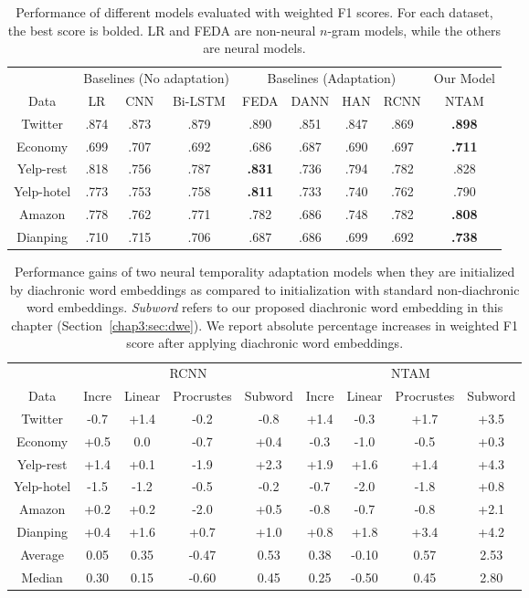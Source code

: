 \begin{table}[t]
\centering
\begin{tabular}{c||ccc||cccc||c}
 & \multicolumn{3}{c||}{Baselines (No adaptation)} & \multicolumn{4}{c||}{Baselines (Adaptation)} & Our Model \\
Data & LR & CNN & Bi-LSTM & FEDA & DANN & HAN & RCNN & NTAM\\\hline\hline
Twitter & .874 & .873 & .879 & .890 & .851 & .847 & .869 & \textbf{.898} \\
Economy & .699 & .707 & .692 & .686 & .687 & .690 & .697 &  \textbf{.711} \\
Yelp-rest & .818 & .756 & .787 & \textbf{.831} & .736 & .794 & .782 & .828 \\
Yelp-hotel & .773 & .753 & .758 & \textbf{.811} & .733 & .740 & .762 & .790 \\
Amazon & .778 & .762 & .771 & .782 & .686 & .748 & .782 & \textbf{.808} \\
Dianping & .710 & .715 & .706 & .687 & .686 & .699 & .692 & \textbf{.738}
\end{tabular}
\caption{Performance of different models evaluated with weighted F1 scores. For each dataset, the best score is bolded. 
LR and FEDA are non-neural $n$-gram models, while the others are neural models.
}
\label{chap3:tab:results}
\end{table}


\begin{table}[t]
\centering
\begin{tabular}{c||cccc||cccc}
 & \multicolumn{4}{c||}{RCNN} & \multicolumn{4}{c}{NTAM} \\
Data & Incre & Linear & Procrustes & Subword & Incre & Linear & Procrustes & Subword\\\hline\hline
Twitter & -0.7 & +1.4 & -0.2 & -0.8 & +1.4 & -0.3 & +1.7 & +3.5\\
Economy & +0.5 & 0.0 & -0.7 & +0.4 & -0.3 & -1.0 & -0.5 & +0.3\\
Yelp-rest & +1.4 & +0.1 & -1.9 & +2.3 & +1.9 & +1.6 & +1.4 & +4.3\\
Yelp-hotel & -1.5 & -1.2 & -0.5 & -0.2 & -0.7 & -2.0 & -1.8 & +0.8\\
Amazon & +0.2 & +0.2 & -2.0 & +0.5 & -0.8 & -0.7 & -0.8 & +2.1\\
Dianping & +0.4 & +1.6 & +0.7 & +1.0 & +0.8 & +1.8 & +3.4 & +4.2\\\hline\hline
Average & 0.05 & 0.35 & -0.47 & 0.53 & 0.38 & -0.10 & 0.57 & 2.53\\
Median & 0.30 & 0.15 & -0.60 & 0.45 & 0.25 & -0.50 & 0.45 & 2.80\\
\end{tabular}
\caption{Performance gains of two neural temporality adaptation models when they are initialized by diachronic word embeddings as compared to initialization with standard non-diachronic word embeddings. \textit{Subword} refers to our proposed diachronic word embedding in this chapter (Section~\ref{chap3:sec:dwe}). We report absolute percentage increases in weighted F1 score after applying diachronic word embeddings.}
\label{chap3:tab:dia}
\end{table}


